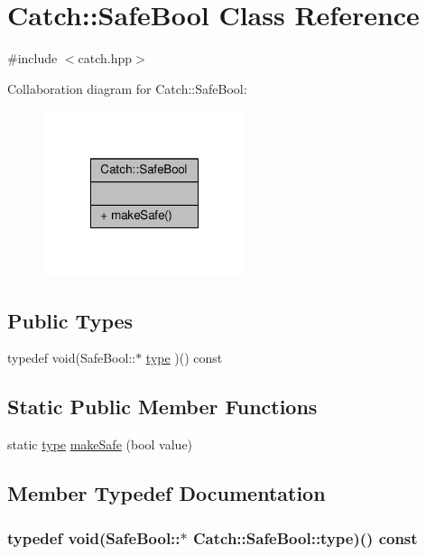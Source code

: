 \hypertarget{class_catch_1_1_safe_bool}{\section{Catch\-:\-:Safe\-Bool Class Reference}
\label{class_catch_1_1_safe_bool}
}


{\ttfamily \#include $<$catch.\-hpp$>$}



Collaboration diagram for Catch\-:\-:Safe\-Bool\-:
\nopagebreak
\begin{figure}[H]
\begin{center}
\leavevmode
\includegraphics[width=168pt]{class_catch_1_1_safe_bool__coll__graph}
\end{center}
\end{figure}
\subsection*{Public Types}
\begin{DoxyCompactItemize}
\item 
typedef void(Safe\-Bool\-::$\ast$ \hyperlink{class_catch_1_1_safe_bool_a14cd49eced5b255a1f59512d3b9395ae}{type} )() const 
\end{DoxyCompactItemize}
\subsection*{Static Public Member Functions}
\begin{DoxyCompactItemize}
\item 
static \hyperlink{class_catch_1_1_safe_bool_a14cd49eced5b255a1f59512d3b9395ae}{type} \hyperlink{class_catch_1_1_safe_bool_af0ea63d9820f8bf7a8b76377913c4e77}{make\-Safe} (bool value)
\end{DoxyCompactItemize}


\subsection{Member Typedef Documentation}
\hypertarget{class_catch_1_1_safe_bool_a14cd49eced5b255a1f59512d3b9395ae}{
\subsubsection[{type}]{\setlength{\rightskip}{0pt plus 5cm}typedef void(Safe\-Bool\-::$\ast$ Catch\-::\-Safe\-Bool\-::type)() const }}\label{class_catch_1_1_safe_bool_a14cd49eced5b255a1f59512d3b9395ae}


